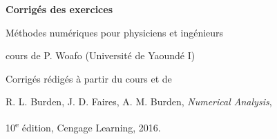 \documentclass[11pt,a4paper,oneside]{report}
\begin{document}
\begin{titlepage}
  \centering
  \vspace*{3cm}
  {\Huge\bfseries Corrigés des exercices\par}
  \vspace{1cm}
  {\Large Méthodes numériques pour physiciens et ingénieurs\par}
  \vspace{0.3cm}
  {\large cours de P. Woafo (Université de Yaoundé I)\par}
  \vfill
  {\normalsize Corrigés rédigés à partir du cours et de\par
   R. L. Burden, J. D. Faires, A. M. Burden, \textit{Numerical Analysis},\par
   10\textsuperscript{e} édition, Cengage Learning, 2016.\par}
  \vspace{2cm}
\end{titlepage}



\tableofcontents











\end{document}
